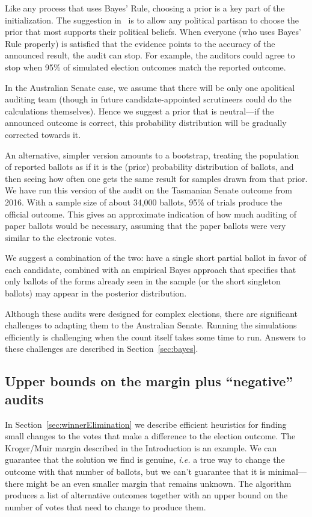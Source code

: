 \documentclass[10pt,a4paper]{article}
\newcommand{\shortVersion}[1]{}
\newcommand{\longVersion}[1]{#1}
\newcommand{\shortVersion}[1]{#1}
\newcommand{\longVersion}[1]{}
\begin{document}
Like any process that uses Bayes' Rule, choosing a prior is a key part
of the initialization.  The suggestion in~\cite{rivest2012bayesian} is
to allow any political partisan to choose the prior that most supports
their political beliefs.  When everyone (who uses Bayes' Rule
properly) is satisfied that the evidence points to the accuracy of the
announced result, the audit can stop.  For example, the auditors could
agree to stop when 95\% of simulated election outcomes match the
reported outcome.

In the Australian Senate case, we assume that there will be only one
apolitical auditing team (though in future candidate-appointed
scrutineers could do the calculations themselves).  Hence we suggest a
prior that is neutral---if the announced outcome is correct, this
probability distribution will be gradually corrected towards it.

An alternative, simpler version amounts to a bootstrap, treating the
population of reported ballots as if it is the (prior) probability
distribution of ballots, and then seeing how often one gets the same
result for samples drawn from that prior.  We have run this version of the audit 
on the Tasmanian Senate outcome from 2016.  With a sample size of about 
34,000 ballots,  95\% of trials produce the official outcome.  This gives an approximate
indication of how much auditing of paper ballots would be necessary, assuming that 
the paper ballots were very similar to the electronic votes.

We suggest a combination of the two: have a single short partial ballot in
favor of each candidate, combined with an empirical Bayes approach that
specifies that only ballots of the forms already seen in the sample
(or the short singleton ballots) may appear in the posterior distribution.

Although these audits were designed for complex elections, there are
significant challenges to adapting them to the Australian Senate.  
Running the simulations efficiently is challenging when the count itself takes
some time to run.  Answers to these challenges are described in
\shortVersion{the full version of the paper.}\longVersion{Section~\ref{sec:bayes}.}

\subsection{Upper bounds on the margin plus ``negative'' audits}  \label{subsec:upperBounds}
In \longVersion{Section~\ref{sec:winnerElimination}}\shortVersion{the full version of this paper} we describe efficient heuristics for finding small changes to the votes that make a difference to the election outcome.  The Kroger/Muir margin described in the Introduction is an example.     
We can guarantee that the solution we find is genuine, {\it i.e.} a true way to change the outcome with that number of ballots, but we can't guarantee that it is minimal---there might be an even smaller margin that remains unknown.  The algorithm produces a list of alternative outcomes together with an upper bound on the number of votes that need to change to produce them.
\end{document}
